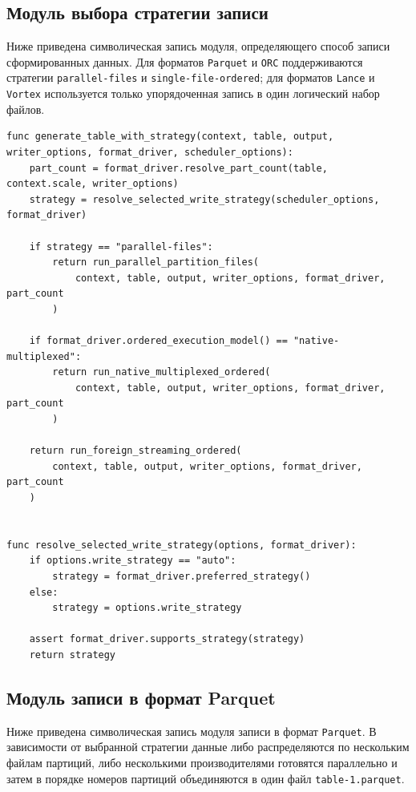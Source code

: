 \subsection{Модуль выбора стратегии записи}

Ниже приведена символическая запись модуля, определяющего способ записи
сформированных данных. Для форматов \texttt{Parquet} и \texttt{ORC}
поддерживаются стратегии \texttt{parallel-files} и
\texttt{single-file-ordered}; для форматов \texttt{Lance} и \texttt{Vortex}
используется только упорядоченная запись в один логический набор файлов.

\begin{lstlisting}[caption={Выбор стратегии записи}]
func generate_table_with_strategy(context, table, output, writer_options, format_driver, scheduler_options):
    part_count = format_driver.resolve_part_count(table, context.scale, writer_options)
    strategy = resolve_selected_write_strategy(scheduler_options, format_driver)

    if strategy == "parallel-files":
        return run_parallel_partition_files(
            context, table, output, writer_options, format_driver, part_count
        )

    if format_driver.ordered_execution_model() == "native-multiplexed":
        return run_native_multiplexed_ordered(
            context, table, output, writer_options, format_driver, part_count
        )

    return run_foreign_streaming_ordered(
        context, table, output, writer_options, format_driver, part_count
    )


func resolve_selected_write_strategy(options, format_driver):
    if options.write_strategy == "auto":
        strategy = format_driver.preferred_strategy()
    else:
        strategy = options.write_strategy

    assert format_driver.supports_strategy(strategy)
    return strategy
\end{lstlisting}

\subsection{Модуль записи в формат Parquet}

Ниже приведена символическая запись модуля записи в формат \texttt{Parquet}. В
зависимости от выбранной стратегии данные либо распределяются по нескольким
файлам партиций, либо несколькими производителями готовятся параллельно и затем
в порядке номеров партиций объединяются в один файл
\texttt{table-1.parquet}.

